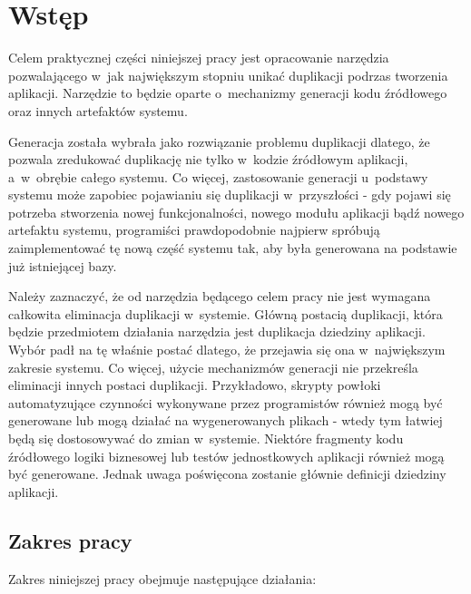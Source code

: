 \chapter{Wstęp} \label{chap:intro}

Celem praktycznej części niniejszej pracy jest opracowanie narzędzia pozwalającego w~jak największym stopniu unikać duplikacji podrzas tworzenia aplikacji.
Narzędzie to będzie oparte o~mechanizmy generacji kodu źródłowego oraz innych artefaktów systemu.

Generacja została wybrała jako rozwiązanie problemu duplikacji dlatego, że pozwala zredukować duplikację nie tylko w~kodzie źródłowym aplikacji, a~w~obrębie całego systemu.
Co więcej, zastosowanie generacji u~podstawy systemu może zapobiec pojawianiu się duplikacji w~przyszłości - gdy pojawi się potrzeba stworzenia nowej funkcjonalności, nowego modułu aplikacji bądź nowego artefaktu systemu, programiści prawdopodobnie najpierw spróbują zaimplementować tę nową część systemu tak, aby była generowana na podstawie już istniejącej bazy.

Należy zaznaczyć, że od narzędzia będącego celem pracy nie jest wymagana całkowita eliminacja duplikacji w~systemie.
Główną postacią duplikacji, która będzie przedmiotem działania narzędzia jest duplikacja dziedziny aplikacji.
Wybór padł na tę właśnie postać dlatego, że przejawia się ona w~największym zakresie systemu.
Co więcej, użycie mechanizmów generacji nie przekreśla eliminacji innych postaci duplikacji.
Przykładowo, skrypty powłoki automatyzujące czynności wykonywane przez programistów również mogą być generowane lub mogą działać na wygenerowanych plikach - wtedy tym łatwiej będą się dostosowywać do zmian w~systemie.
Niektóre fragmenty kodu źródłowego logiki biznesowej lub testów jednostkowych aplikacji również mogą być generowane.
Jednak uwaga poświęcona zostanie głównie definicji dziedziny aplikacji.



\section{Zakres pracy}

Zakres niniejszej pracy obejmuje następujące działania:

